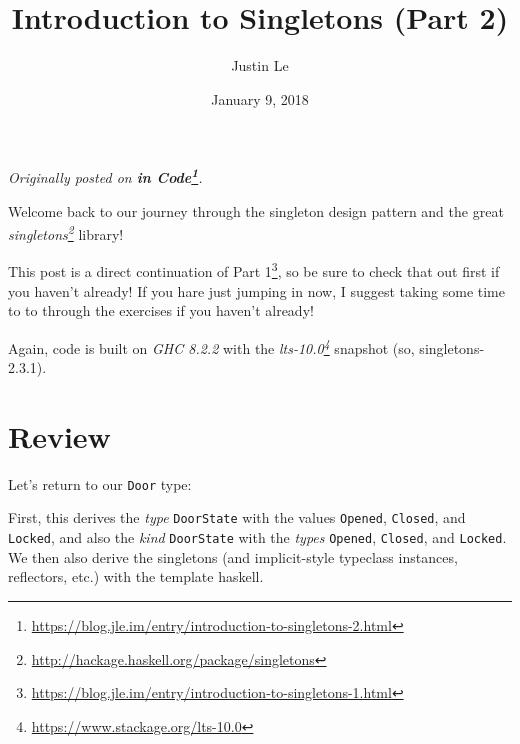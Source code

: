 \documentclass[]{article}
\title{Introduction to Singletons (Part 2)}
\author{Justin Le}
\date{January 9, 2018}
\newenvironment{Shaded}{}{}
\newcommand{\CommentTok}[1]{\textcolor[rgb]{0.38,0.63,0.69}{\textit{#1}}}
\newcommand{\DataTypeTok}[1]{\textcolor[rgb]{0.56,0.13,0.00}{#1}}
\newcommand{\FunctionTok}[1]{\textcolor[rgb]{0.02,0.16,0.49}{#1}}
\newcommand{\KeywordTok}[1]{\textcolor[rgb]{0.00,0.44,0.13}{\textbf{#1}}}
\newcommand{\NormalTok}[1]{#1}
\newcommand{\OtherTok}[1]{\textcolor[rgb]{0.00,0.44,0.13}{#1}}
\renewcommand{\href}[2]{#2\footnote{\url{#1}}}
\begin{document}
\maketitle

\emph{Originally posted on
\textbf{\href{https://blog.jle.im/entry/introduction-to-singletons-2.html}{in
Code}}.}

Welcome back to our journey through the singleton design pattern and the great
\emph{\href{http://hackage.haskell.org/package/singletons}{singletons}} library!

This post is a direct continuation of
\href{https://blog.jle.im/entry/introduction-to-singletons-1.html}{Part 1}, so
be sure to check that out first if you haven't already! If you hare just jumping
in now, I suggest taking some time to to through the exercises if you haven't
already!

Again, code is built on \emph{GHC 8.2.2} with the
\emph{\href{https://www.stackage.org/lts-10.0}{lts-10.0}} snapshot (so,
singletons-2.3.1).

\hypertarget{review}{%
\section{Review}\label{review}}

Let's return to our \texttt{Door} type:

\begin{Shaded}
\end{Shaded}

First, this derives the \emph{type} \texttt{DoorState} with the values
\texttt{Opened}, \texttt{Closed}, and \texttt{Locked}, and also the \emph{kind}
\texttt{DoorState} with the \emph{types} \texttt{\textquotesingle{}Opened},
\texttt{\textquotesingle{}Closed}, and \texttt{\textquotesingle{}Locked}. We
then also derive the singletons (and implicit-style typeclass instances,
reflectors, etc.) with the template haskell.
\end{document}
